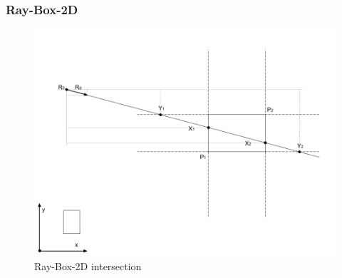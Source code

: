 \subsubsection{Ray-Box-2D}

\begin{figure}[H]
\caption[ray-box-2d-intersection]{Ray-Box-2D intersection}
\label{fig:ray-box-2d}
\centering
\includegraphics[width=\linewidth]{Figures/ray-box-2d-intersection.png}
\decoRule
\end{figure}


